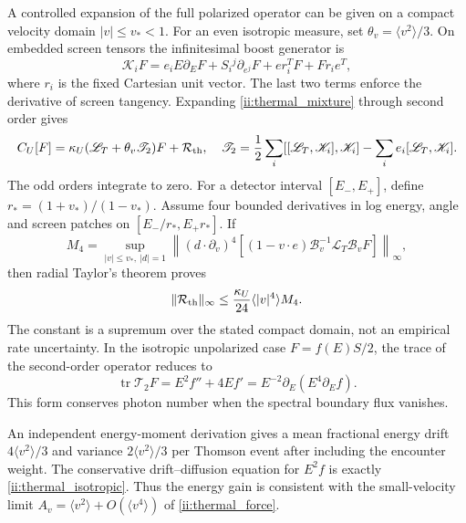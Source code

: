 A controlled expansion of the full polarized operator can be given on a compact velocity domain $|v|\le v_*<1$. For an even isotropic measure, set $\theta_v=\langle v^2\rangle/3$. On embedded screen tensors the infinitesimal boost generator is
\begin{equation}
 \mathscr K_iF=e_iE\partial_EF+S_i{}^j\partial_{e^j}F
                         +e r_i^TF+Fr_ie^T,
 \label{ii:boost_generator}
\end{equation}
where $r_i$ is the fixed Cartesian unit vector. The last two terms enforce the derivative of screen tangency. Expanding \eqref{ii:thermal_mixture} through second order gives
\begin{equation}
 C_U[F]=\kappa_U(\mathscr L_T+\theta_v\mathscr T_2)F+\mathcal R_{\rm th},
 \quad
 \mathscr T_2=\frac12\sum_i[[\mathscr L_T,\mathscr K_i],\mathscr K_i]
                         -\sum_i e_i[\mathscr L_T,\mathscr K_i].
 \label{ii:thermal_operator}
\end{equation}
The odd orders integrate to zero. For a detector interval $[E_-,E_+]$, define $r_*=(1+v_*)/(1-v_*)$. Assume four bounded derivatives in log energy, angle and screen patches on $[E_-/r_*,E_+r_*]$. If
\begin{equation}
 M_4=\sup_{|v|\le v_*,\ |d|=1}
 \left\|(d\cdot\partial_v)^4
  [(1-v\cdot e)\mathcal B_v^{-1}\mathscr L_T\mathcal B_vF]\right\|_\infty,
 \label{ii:thermal_derivative_bound}
\end{equation}
then radial Taylor's theorem proves
\begin{equation}
 \|\mathcal R_{\rm th}\|_\infty
          \le\frac{\kappa_U}{24}\langle |v|^4\rangle M_4.
 \label{ii:thermal_remainder}
\end{equation}
The constant is a supremum over the stated compact domain, not an empirical rate uncertainty. In the isotropic unpolarized case $F=f(E)S/2$, the trace of the second-order operator reduces to
\begin{equation}
 \operatorname{tr}\mathscr T_2F=E^2f''+4Ef'
                    =E^{-2}\partial_E(E^4\partial_Ef).
 \label{ii:thermal_isotropic}
\end{equation}
This form conserves photon number when the spectral boundary flux vanishes.

An independent energy-moment derivation gives a mean fractional energy drift $4\langle v^2\rangle/3$ and variance $2\langle v^2\rangle/3$ per Thomson event after including the encounter weight. The conservative drift--diffusion equation for $E^2f$ is exactly \eqref{ii:thermal_isotropic}. Thus the energy gain is consistent with the small-velocity limit $A_v=\langle v^2\rangle+O(\langle v^4\rangle)$ of \eqref{ii:thermal_force}.

